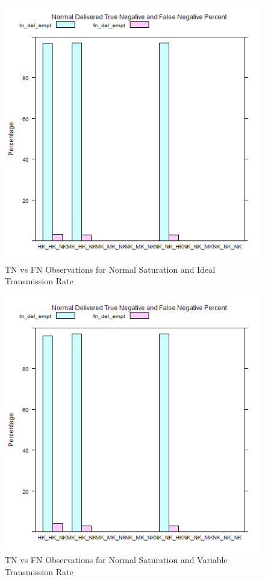 	\begin{figure}[H]
	\centering
	\includegraphics[width=\textwidth]{Chap7/figures/plots/normal_ideal/tnvsfn_percent.png}
	\caption{TN vs FN Observations for Normal Saturation and Ideal Transmission Rate}
	\label{fig:sim:res:norm:ideal:tnfn}
	\end{figure}

	\begin{figure}[H]
	\centering
	\includegraphics[width=\textwidth]{Chap7/figures/plots/normal_variable/tnvsfn_percent.png}
	\caption{TN vs FN Observations for Normal Saturation and Variable Transmission Rate}
	\label{fig:sim:res:norm:variable:tnfn}
	\end{figure}

